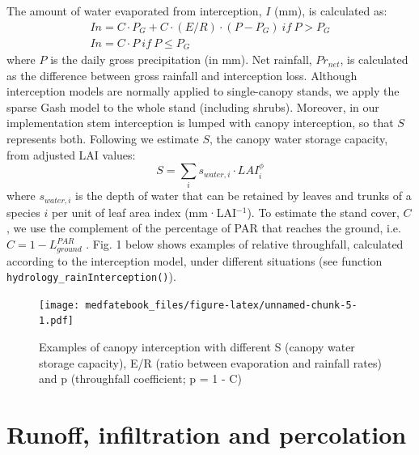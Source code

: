 \documentclass[]{book}
\begin{document}
The amount of water evaporated from interception, \(I\) (mm), is calculated as:
\begin{eqnarray}
In = C\cdot P_G+C\cdot(E/R)\cdot(P-P_G) \: {if}\: P > P_G \\
In = C\cdot P\: {if}\: P \leq P_G
\end{eqnarray}
where \(P\) is the daily gross precipitation (in mm). Net rainfall, \(Pr_{net}\), is
calculated as the difference between gross rainfall and interception loss.
Although interception models are normally applied to single-canopy stands, we
apply the sparse Gash model to the whole stand (including shrubs). Moreover, in
our implementation stem interception is lumped with canopy interception, so that
\(S\) represents both. Following \citet{Watanabe1996} we estimate \(S\), the
canopy water storage capacity, from adjusted LAI values:
\begin{equation}
S=\sum_{i}{s_{water,i}\cdot LAI_{i}^{\phi}}
\end{equation}
where \(s_{water,i}\) is the depth of water that can be retained by leaves and
trunks of a species \(i\) per unit of leaf area index (mm·LAI\(^{-1}\)). To estimate
the stand cover, \(C\), we use the complement of the percentage of PAR that reaches
the ground, i.e. \(C = 1 - L^{PAR}_{ground}\) \citep{Deguchi2006}. Fig. 1 below
shows examples of relative throughfall, calculated according to the interception
model, under different situations (see function \texttt{hydrology\_rainInterception()}).

\begin{figure}
\centering
\texttt{[image: medfatebook\_files/figure-latex/unnamed-chunk-5-1.pdf]}
\caption{\label{fig:unnamed-chunk-5}Examples of canopy interception with different S (canopy water storage capacity), E/R (ratio between evaporation and rainfall rates) and p (throughfall coefficient; p = 1 - C)}
\end{figure}

\hypertarget{runoff}{%
\section{Runoff, infiltration and percolation}\label{runoff}}
\end{document}

